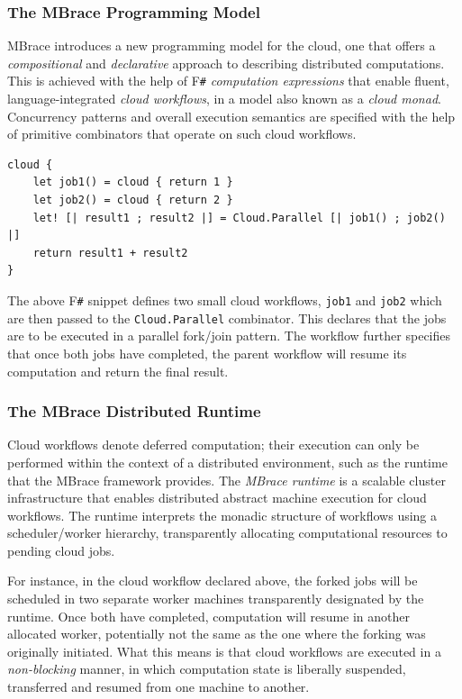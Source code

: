 \documentclass[9pt,a4paper]{article}
\newcommand{\mbrace}{MBrace}
\newcommand{\Mbrace}{MBrace}
\newcommand{\TitularMbrace}{MBrace}
\newcommand{\fsharp}{F\texttt \#}
\begin{document}
\subsubsection*{The \TitularMbrace{} Programming Model}

\Mbrace{} introduces a new programming model for the cloud, one that offers a 
\emph{compositional} and \emph{declarative} approach to describing distributed 
computations. This is achieved with the help of \fsharp{} \emph{computation expressions} 
that enable fluent, language-integrated \emph{cloud workflows}, in a model also known
as a \emph{cloud monad}. Concurrency patterns and overall execution semantics are specified 
with the help of primitive combinators that operate on such cloud workflows.
%
\begin{lstlisting}
cloud {
	let job1() = cloud { return 1 }
	let job2() = cloud { return 2 }
	let! [| result1 ; result2 |] = Cloud.Parallel [| job1() ; job2() |]	
	return result1 + result2
}
\end{lstlisting}
The above \fsharp{} snippet defines two small cloud workflows, \texttt{job1} and
\texttt{job2} which are then passed to the \texttt{Cloud.Parallel}
combinator. This declares that the jobs are to be executed in a parallel
fork/join pattern. The workflow further specifies that once both jobs have
completed, the parent workflow will resume its computation and return the final
result.
%

\subsubsection*{The \TitularMbrace{} Distributed Runtime}

Cloud workflows denote deferred computation; their execution can only be performed within
the context of a distributed environment, such as the runtime that the \mbrace{}
framework provides. The \emph{\mbrace{} runtime} is a scalable cluster infrastructure that
enables distributed abstract machine execution for cloud workflows.
The runtime interprets the monadic structure of workflows using a scheduler/worker hierarchy, 
transparently allocating computational resources to pending cloud jobs.

For instance, in the cloud workflow declared above, the forked jobs will be
scheduled in two separate worker machines transparently designated by the
runtime. Once both have completed, computation will resume in another allocated
worker, potentially not the same as the one where the forking was originally
initiated. What this means is that cloud workflows are executed in a
\emph{non-blocking} manner, in which computation state is liberally suspended,
transferred and resumed from one machine to another.
\end{document}
